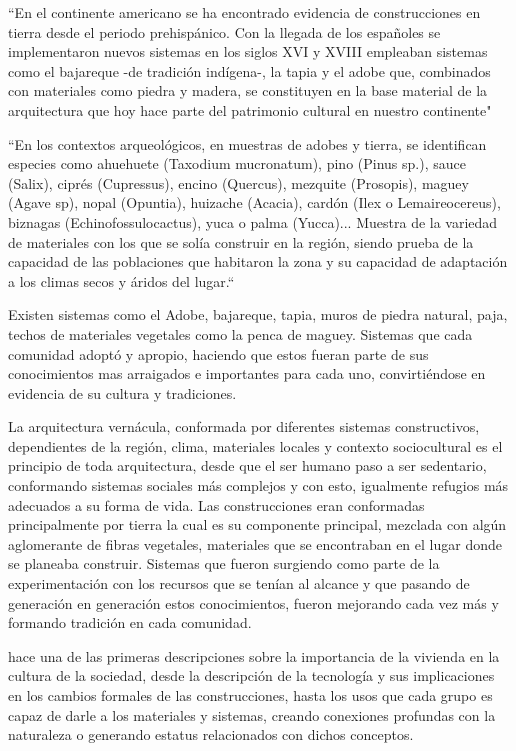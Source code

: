``En el continente americano se ha encontrado evidencia de construcciones en tierra desde el periodo prehispánico. Con la llegada de los españoles se implementaron nuevos sistemas en los siglos XVI y XVIII empleaban sistemas como el bajareque -de tradición indígena-, la tapia y el adobe que, combinados con materiales como piedra y madera, se constituyen en la base material de la arquitectura que hoy hace parte del patrimonio cultural en nuestro continente"\citep{beltrantradicion}

``En los contextos arqueológicos, en muestras de adobes y tierra, se identifican especies como ahuehuete (Taxodium mucronatum), pino (Pinus sp.), sauce (Salix), ciprés (Cupressus), encino (Quercus), mezquite (Prosopis), maguey (Agave sp), nopal (Opuntia), huizache (Acacia), cardón (Ilex o Lemaireocereus), biznagas (Echinofossulocactus), yuca o palma (Yucca)... Muestra de la variedad de materiales con los que se solía construir en la región, siendo prueba de la capacidad de las poblaciones que habitaron la zona y su capacidad de adaptación a los climas secos y áridos del lugar.``\citep[p. 5]{aguilar2009}

Existen sistemas como el Adobe, bajareque, tapia, muros de piedra natural, paja, techos de materiales vegetales como la penca de maguey. Sistemas que cada comunidad adoptó y apropio, haciendo que estos fueran parte de sus conocimientos mas arraigados e importantes para cada uno, convirtiéndose en evidencia de su cultura y tradiciones.

La arquitectura vernácula, conformada por diferentes sistemas constructivos, dependientes de la región, clima, materiales locales y contexto sociocultural es el principio de toda arquitectura, desde que el ser humano paso a ser sedentario, conformando sistemas sociales más complejos y con esto, igualmente refugios más adecuados a su forma de vida. Las construcciones eran conformadas principalmente por tierra la cual es su componente principal, mezclada con algún aglomerante de fibras vegetales, materiales que se encontraban en el lugar donde se planeaba construir. Sistemas que fueron surgiendo como parte de la experimentación con los recursos que se tenían al alcance y que pasando de generación en generación estos conocimientos, fueron mejorando cada vez más y formando tradición en cada comunidad.

\citeauthor{rapoport1972vivienda} hace una de las primeras descripciones sobre la importancia de la vivienda en la cultura de la sociedad, desde la descripción de la tecnología y sus implicaciones en los cambios formales de las construcciones, hasta los usos que cada grupo es capaz de darle a los materiales y sistemas, creando conexiones profundas con la naturaleza o generando estatus relacionados con dichos conceptos.

